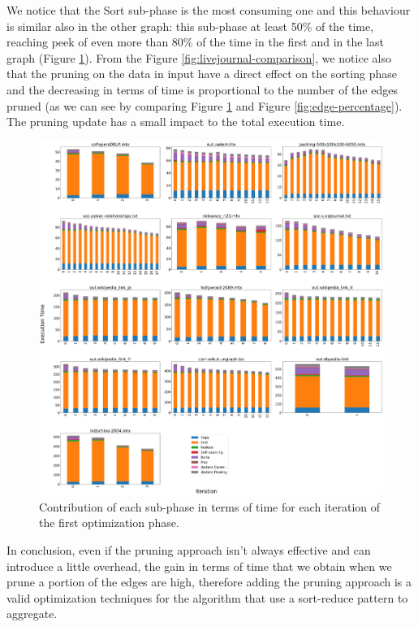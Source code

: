 We notice that the Sort sub-phase is the most consuming one and this behaviour is similar also in the other graph: this sub-phase at least 50\% of the time, reaching peek of even more than 80\% of the time in the first and in the last graph (Figure \ref{fig:suphases-sort}). From the Figure \ref{fig:livejournal-comparison}, we notice also that the pruning on the data in input have a direct effect on the sorting phase and the decreasing in terms of time is proportional to the number of the edges pruned (as we can see by comparing Figure \ref{fig:suphases-sort} and Figure \ref{fig:edge-percentage}). The pruning update has a small impact to the total execution time. 
\begin{figure}[t!]
	\centering
	\includegraphics[width=1\linewidth]{0-resources/suphases-sort}
	\caption{Contribution of each sub-phase in terms of time for each iteration of the first optimization phase. }
	\label{fig:suphases-sort}
\end{figure}
In conclusion, even if the pruning approach isn't always effective and can introduce a little overhead, the gain in terms of time that we obtain when we prune a portion of the edges are high, therefore adding the pruning approach is a valid optimization techniques for the algorithm that use a sort-reduce pattern to aggregate. 
